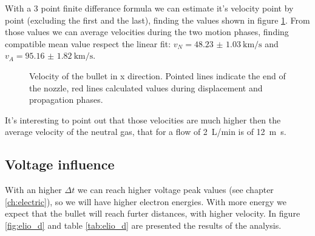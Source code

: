With a 3 point finite differance formula we can estimate it's velocity point by point (excluding the first and the last), finding the values shown in figure \ref{fig:elio_d035_vx}. From those values we can average velocities during the two motion phases, finding compatible mean value respect the linear fit: $v_{N} = \SI{48.23(103)}{\kilo\meter/\second}$ and $v_{A} = \SI{95.16(182)}{\kilo\meter/\second}$.
\begin{figure}
 \centering
 \hfill
 \caption{Velocity of the bullet in x direction. Pointed lines indicate the end of the nozzle, red lines calculated values during displacement and propagation phases.}
 \label{fig:elio_d035_vx}
\end{figure}

It's interesting to point out that those velocities are much higher then the average velocity of the neutral gas, that for a flow of \SI{2}{\liter/\minute} is of \SI{12}{\meter\second}.

\subsection{Voltage influence}
With an higher $\Delta t$ we can reach higher voltage peak values (see chapter \ref{ch:electric}), so we will have higher electron energies. With more energy we expect that the bullet will reach furter distances, with higher velocity. In figure \ref{fig:elio_d} and table \ref{tab:elio_d} are presented the results of the analysis.

